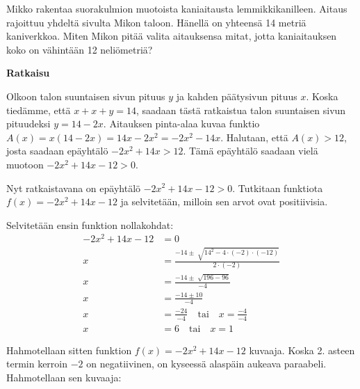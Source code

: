 \begin{esimerkki}
Mikko rakentaa suorakulmion muotoista kaniaitausta lemmikkikanilleen. Aitaus rajoittuu yhdeltä sivulta Mikon taloon. Hänellä on yhteensä 14 metriä kaniverkkoa. Miten Mikon pitää valita aitauksensa mitat, jotta kaniaitauksen koko on vähintään 12 neliömetriä?


\textbf{Ratkaisu}

Olkoon talon suuntaisen sivun pituus $y$ ja kahden päätysivun pituus $x$. Koska tiedämme, että $x+x+y=14$, saadaan tästä ratkaistua talon suuntaisen sivun pituudeksi $y=14 - 2x$.
Aitauksen pinta-alaa kuvaa funktio $A(x)=x(14-2x)=14x-2x^2=-2x^2-14x$.
Halutaan, että $A(x)>12$, josta saadaan epäyhtälö $-2x^2+14x>12$. Tämä epäyhtälö saadaan vielä muotoon $-2x^2+14x-12>0$.

Nyt ratkaistavana on epäyhtälö $-2x^2+14x-12>0$. Tutkitaan funktiota $f(x)=-2x^2+14x-12$ ja selvitetään, milloin sen arvot ovat positiivisia.

Selvitetään ensin funktion nollakohdat:
\begin{align*}
-2x^2+14x-12&=0 \\
x&=\frac{-14 \pm \sqrt[]{14^2-4 \cdot (-2) \cdot (-12)}}{2 \cdot (-2)} \\
x&=\frac{-14 \pm \sqrt[]{196-96}}{-4} \\
x&=\frac{-14 \pm 10}{-4} \\
x&=\frac{-24}{-4} \quad \text{tai} \quad x=\frac{-4}{-4} \\
x&=6 \quad \text{tai} \quad x=1
\end{align*}

Hahmotellaan sitten funktion $f(x)=-2x^2+14x-12$ kuvaaja. Koska 2. asteen termin kerroin $-2$ on negatiivinen, on kyseessä alaspäin aukeava paraabeli. Hahmotellaan sen kuvaaja:

\begin{lukusuora}{-2.5}{2.5}{5}
\end{lukusuora}


\end{esimerkki}
